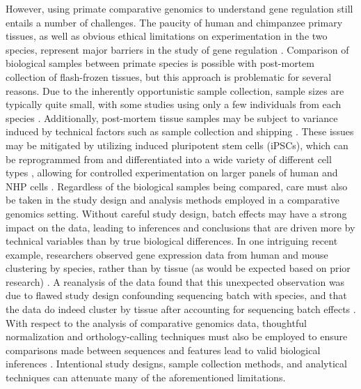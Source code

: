 However, using primate comparative genomics to understand gene regulation still entails a number of challenges. The paucity of human and chimpanzee primary tissues, as well as obvious ethical limitations on experimentation in the two species, represent major barriers in the study of gene regulation \cite{Romero.2012}. Comparison of biological samples between primate species is possible with post-mortem collection of flash-frozen tissues, but this approach is problematic for several reasons. Due to the inherently opportunistic sample collection, sample sizes are typically quite small, with some studies using only a few individuals from each species \cite{Blekhman.2008, Pai.2011, Prescott.2015}. Additionally, post-mortem tissue samples may be subject to variance induced by technical factors such as sample collection and shipping \cite{Blake.2020, Chevyreva.2008}. These issues may be mitigated by utilizing induced pluripotent stem cells (iPSCs), which can be reprogrammed from and differentiated into a wide variety of different cell types \cite{Takahashi.2006, Takahashi.2007, Sun.2009}, allowing for controlled experimentation on larger panels of human and NHP cells \cite{Romero.2015, Marchetto.2013}. Regardless of the biological samples being compared, care must also be taken in the study design and analysis methods employed in a comparative genomics setting. Without careful study design, batch effects may have a strong impact on the data, leading to inferences and conclusions that are driven more by technical variables than by true biological differences. In one intriguing recent example, researchers observed gene expression data from human and mouse clustering by species, rather than by tissue (as would be expected based on prior research) \cite{Consortium.2012ec, Yue.2014}. A reanalysis of the data found that this unexpected observation was due to flawed study design confounding sequencing batch with species, and that the data do indeed cluster by tissue after accounting for sequencing batch effects \cite{Gilad.2015}. With respect to the analysis of comparative genomics data, thoughtful normalization and orthology-calling techniques must also be employed to ensure comparisons made between sequences and features lead to valid biological inferences \cite{Vallender.2009, Zhou.2019, Blekhman.2010, Cain.2011}. Intentional study designs, sample collection methods, and analytical techniques can attenuate many of the aforementioned limitations.

